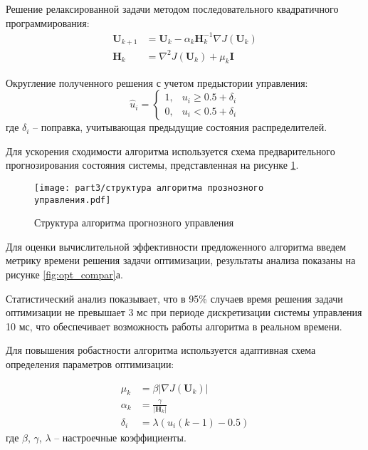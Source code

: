 Решение релаксированной задачи методом последовательного квадратичного программирования:
\begin{equation*}
	\begin{aligned}
		\mathbf{U}_{k+1} & = \mathbf{U}_k - \alpha_k \mathbf{H}_k^{-1}\nabla J(\mathbf{U}_k) \\
		\mathbf{H}_k     & = \nabla^2 J(\mathbf{U}_k) + \mu_k\mathbf{I}
	\end{aligned}
\end{equation*}

Округление полученного решения с учетом предыстории управления:
\begin{equation*}
	\hat{u}_i = \begin{cases}
		1, & u_i \geq 0.5 + \delta_i \\
		0, & u_i < 0.5 + \delta_i
	\end{cases}
\end{equation*}
где $\delta_i$ -- поправка, учитывающая предыдущие состояния распределителей.

Для ускорения сходимости алгоритма используется схема предварительного прогнозирования состояния системы, представленная
на рисунке \ref{fig:mpc_structure}.

\begin{figure}[ht]
	\centering
	\texttt{[image: part3/структура алгоритма прознозного управления.pdf]}
	\caption{Структура алгоритма прогнозного управления}\label{fig:mpc_structure}
\end{figure}

Для оценки вычислительной эффективности предложенного алгоритма введем метрику времени решения задачи
оптимизации, результаты анализа показаны на рисунке \ref{fig:opt_compar}а.

Статистический анализ показывает, что в 95\% случаев время решения задачи
оптимизации не превышает 3 мс при периоде дискретизации системы управления
10 мс, что обеспечивает возможность работы алгоритма в реальном времени.

Для повышения робастности алгоритма используется адаптивная схема определения
параметров оптимизации:

\begin{equation*}
	\begin{aligned}
		\mu_k    & = \beta|\nabla J(\mathbf{U}_k)| \\
		\alpha_k & = \frac{\gamma}{|\mathbf{H}_k|} \\
		\delta_i & = \lambda(u_i(k-1) - 0.5)
	\end{aligned}
\end{equation*}
где $\beta$, $\gamma$, $\lambda$ -- настроечные коэффициенты.

